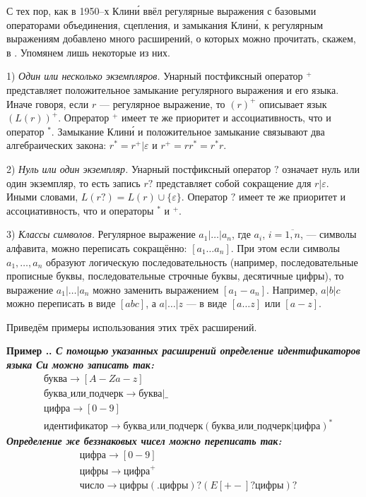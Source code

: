 \documentclass[10pt]{report}
\newcounter{exam}[section]
\renewcommand{\theexam}{\thesection.\arabic{exam}}
\newenvironment{Example}{\par\refstepcounter{exam}\bf Пример \theexam. \sl}{\rm\par}
\begin{document}
С тех пор, как в 1950--х Клин\'{и} ввёл регулярные выражения с базовыми операторами объединения, сцепления, и замыкания Клин\'{и}, к регулярным выражениям добавлено много
расширений, о которых можно прочитать, скажем, в \cite{FridlJ}. Упомянем лишь некоторые из них.

1) \textit{Один или несколько экземпляров. }Унарный постфиксный оператор ${}^+$ представляет положительное замыкание регулярного выражения и его языка. Иначе говоря, если
$r$ --- регулярное выражение, то $(r)^+$ описывает язык $(L(r))^+$. Опрератор ${}^+$ имеет те же приоритет и ассоциативность, что и оператор ${}^*$. Замыкание Клин\'{и} и
положительное замыкание связывают два алгебраических закона: $r^*=r^+|\varepsilon$ и $r^+=rr^*=r^*r$.

2) \textit{Нуль или один экземпляр. }Унарный постфиксный оператор $?$ означает \glqq нуль или один экземпляр\grqq, то есть запись $r?$ представляет собой сокращение для
$r|\varepsilon$. Иными словами, $L(r?)=L(r)\cup\{\varepsilon\}$. Оператор $?$ имеет те же приоритет и ассоциативность, что и операторы ${}^*$ и ${}^+$.

3) \textit{Классы символов. }Регулярное выражение $a_1|\dots|a_n$, где $a_i$, $i=\overline{1,n}$, --- символы алфавита, можно переписать сокращённо: $[a_1\dots a_n]$. При
этом если символы $a_1,\dots,a_n$ образуют логическую последовательность (например, последовательные прописные буквы, последовательные строчные буквы, десятичные цифры), то
выражение $a_1|\dots|a_n$ можно заменить выражением $[a_1-a_n]$. Например, $a|b|c$ можно переписать в виде $[abc]$, а $a|\dots|z$ --- в виде $[a\dots z]$ или $[a-z]$.

Приведём примеры использования этих трёх расширений.
\begin{Example}
С помощью указанных расширений определение идентификаторов языка Си можно записать так:
\begin{align*}
    &\text{буква}\to[A-Za-z]\\
    &\text{буква_или_подчерк}\to\text{буква}|\text{_}\\
    &\text{цифра}\to[0-9]\\
    &\text{идентификатор}\to\text{буква_или_подчерк}(\text{буква_или_подчерк}|\text{цифра})^*
\end{align*}
Определение же беззнаковых чисел можно переписать так:
\begin{align*}
    &\text{цифра}\to[0-9]\\
    &\text{цифры}\to\text{цифра}^+\\
    &\text{число}\to\text{цифры}(.\text{цифры})?(E[{+-}]?\text{цифры})?
\end{align*}
\end{Example}
\end{document}
